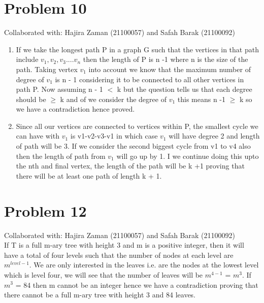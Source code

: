 \documentclass{article}
\begin{document}
\section{Problem 10}
Collaborated with: Hajira Zaman (21100057) and Safah Barak (21100092)\\
\begin{enumerate}
\item %
If we take the longest path P in a graph G such that the vertices in that path include $v_{1},v_{2},v_{3}....v_{n}$ then the length of P is n -1 where n is the size of the path. Taking vertex $v_{1}$ into account we know that the maximum number of degree of $v_{1}$ is n - 1  considering it to be connected to all other vertices in path P. 
Now assuming n - 1 $<$ k but the question tells us that each degree should be $\geq$ k and of we consider the degree of $v_{1}$ this means n -1 $\geq$ k so we have a contradiction hence proved. 

\item %
Since all our vertices are connected to vertices within P, the smallest cycle we can have with $v_{1}$ is v1-v2-v3-v1 in which case $v_{1}$ will have degree 2 and length of path will be 3. If we consider the second biggest cycle from v1 to v4 also then the length of path from $v_{1}$ will go up by 1. I we continue doing this upto the nth and final vertex, the length of the path will be k +1 proving that there will be at least one path of length k + 1. 

\end{enumerate}

\section{Problem 12}
Collaborated with: Hajira Zaman (21100057) and Safah Barak (21100092)\\
If T is a full m-ary tree with height 3 and m is a positive integer, then it will have a total of four levels such that the number of nodes at each level are $m^{level-1}$. We are only interested in the leaves i.e. are the nodes at the lowest level which is level four, we will see that the number of leaves will be $m^{4-1}$ = $m^{3}$. If $m^{3}$ = 84 then m cannot be an integer hence we have a contradiction proving that there cannot be a full m-ary tree with height 3 and 84 leaves. 
 
\end{document}

